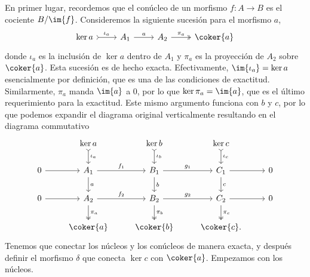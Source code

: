 \documentclass[12pt]{article}
\begin{document}
En primer lugar, recordemos que el conúcleo de un morfismo \( f \colon A \to B \) es el
cociente \( B/\im{f} \). Consideremos la siguiente sucesión para el morfismo \( a \),
\begin{equation*}
	\begin{tikzcd}
		\ker{a} \arrow[r, "\iota_a", tail] & A_1 \arrow[r, "a"] & A_2 \arrow[r,
		"\pi_a", two heads] & \coker{a}
	\end{tikzcd}
\end{equation*}
donde \( \iota_a \) es la inclusión de \( \ker{a} \) dentro de \( A_1 \) y \( \pi_a \) es
la proyección de \( A_2 \) sobre \( \coker{a} \). Esta sucesión es de hecho exacta.
Efectivamente, \( \im{\iota_a} = \ker{a} \) esencialmente por definición, que es una de
las condiciones de exactitud. Similarmente, \( \pi_a \) manda \( \im{a} \) a 0, por lo que
\( \ker{\pi_a} = \im{a} \), que es el último requerimiento para la exactitud. Este mismo
argumento funciona con \( b \) y \( c \), por lo que podemos expandir el diagrama original
verticalmente resultando en el diagrama commutativo
\begin{equation*}
	\begin{tikzcd}
		& \ker{a} \arrow[d, "\iota_a", tail] & \ker{b} \arrow[d, "\iota_b", tail] & \ker{c}
		\arrow[d, "\iota_c", tail] \\
		0 \arrow[r] & A_1 \arrow[r, "f_1"] \arrow[d, "a"] & B_1 \arrow[r, "g_1"] \arrow[d, "b"] & C_1
		\arrow[r] \arrow[d, "c"] & 0 \\
		0 \arrow[r] & A_2 \arrow[r, "f_2"] \arrow[d, "\pi_a", two heads] & B_2 \arrow[r,
		"g_2"] \arrow[d, "\pi_b", two heads] & C_2 \arrow[r] \arrow[d, "\pi_c", two heads] & 0
		\\
								& \coker{a} & \coker{b} & \coker{c}.
	\end{tikzcd}
\end{equation*}
Tenemos que conectar los núcleos y los conúcleos de manera exacta, y después definir el
morfismo \( \delta \) que conecta \( \ker{c} \) con \( \coker{a} \). Empezamos con los
núcleos.
\end{document}
